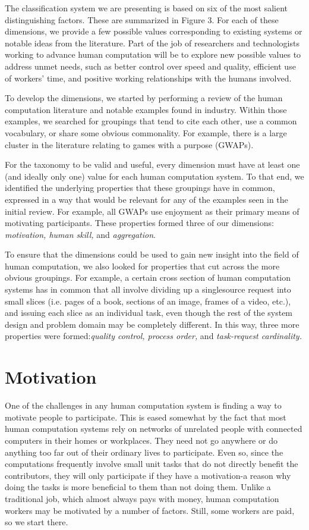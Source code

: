 \documentclass{acm_proc_article-sp}
\begin{document}
The classification system we are presenting is based on six of the most salient distinguishing factors. These are summarized in Figure 3. For each of these dimensions, we provide a few possible values corresponding to existing systems or notable ideas from the literature. Part of the job of researchers and technologists working to advance human computation will be to explore new possible values to address unmet needs, such as better control over speed and quality, efficient use of workers’ time, and positive working relationships with the humans involved.

To develop the dimensions, we started by performing a review of the human computation literature and notable examples found in industry. Within those examples, we searched for groupings that tend to cite each other, use a common vocabulary, or share some obvious commonality. For example, there is a large cluster in the literature relating to games with a purpose (GWAPs).

For the taxonomy to be valid and useful, every dimension must have at least one (and ideally only one) value for each human computation system. To that end, we identified the underlying properties that these groupings have in common, expressed in a way that would be relevant for any of the examples seen in the initial review. For example, all GWAPs use enjoyment as their primary means of motivating participants. These properties formed three of our dimensions: \textit{motivation, human skill,} and \textit{aggregation}.

To ensure that the dimensions could be used to gain new insight into the field of human computation, we also looked for properties that cut across the more obvious groupings. For example, a certain cross section of human computation systems has in common that all involve dividing up a singlesource request into small slices (i.e. pages of a book, sections of an image, frames of a video, etc.), and issuing each slice as an individual task, even though the rest of the system design and problem domain may be completely different. In this way, three more properties were formed:\textit{quality control, process order,} and \textit{task-request cardinality.}
\section*{Motivation}
One of the challenges in any human computation system is finding a way to motivate people to participate. This is eased somewhat by the fact that most human computation systems rely on networks of unrelated people with connected computers in their homes or workplaces. They need not go anywhere or do anything too far out of their ordinary lives to participate. Even so, since the computations frequently involve small unit tasks that do not directly benefit the contributors, they will only participate if they have a motivation-a reason why doing the tasks is more beneficial to them than not doing them. Unlike a traditional job, which almost always pays with money, human computation workers may be motivated by a number of factors. Still, some workers are paid, so we start there.
\end{document}
